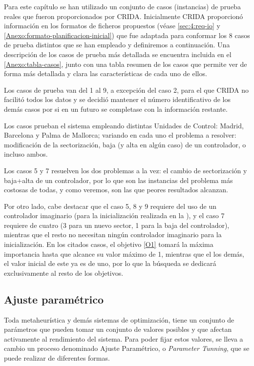 Para este capítulo se han utilizado un conjunto de casos (instancias) de prueba reales que fueron proporcionados por CRIDA. Inicialmente CRIDA proporcionó información en los formatos de ficheros propuestos (véase \autoref{sec:4:req-io} y \autoref{Anexo:formato-planificacion-inicial}) que fue adaptada para conformar los 8 casos de prueba distintos que se han empleado y definiremos a continuación. Una descripción de los casos de prueba más detallada se encuentra incluida en el \autoref{Anexo:tabla-casos}, junto con una tabla resumen de los casos que permite ver de forma más detallada y clara las características de cada uno de ellos.

Los casos de prueba van del 1 al 9, a excepción del caso 2, para el que \gls{CRIDA} no facilitó todos los datos y se decidió mantener el número identificativo de los demás casos por si en un futuro se completase con la información restante.

Los casos prueban el sistema empleando distintas Unidades de Control: Madrid, Barcelona y Palma de Mallorca; variando en cada uno el problema a resolver: modificación de la sectorización, baja (y alta en algún caso) de un controlador, o incluso ambos.

Los casos 5 y 7 resuelven los dos problemas a la vez: el cambio de sectorización y baja+alta de un controlador, por lo que son las instancias del problema más costosas de todas, y como veremos, son las que peores resultados alcanzan. %

Por otro lado, cabe destacar que el caso 5, 8 y 9 requiere del uso de un controlador imaginario (para la inicialización realizada en la \faseuno{}), y el caso 7 requiere de cuatro (3 para un nuevo sector, 1 para la baja del controlador), mientras que el resto no necesitan ningún controlador imaginario para la inicialización. En los citados casos, el objetivo \ref{O1} tomará la máxima importancia hasta que alcance su valor máximo de 1, mientras que el los demás, el valor inicial de este ya es de uno, por lo que la búsqueda se dedicará exclusivamente al resto de los objetivos.

\subsection{Ajuste paramétrico}
Toda metaheurística y demás sistemas de optimización, tiene un conjunto de parámetros que pueden tomar un conjunto de valores posibles y que afectan activamente al rendimiento del sistema. Para poder fijar estos valores, se lleva a cambio un proceso denominado Ajuste Paramétrico, o \textit{Parameter Tunning}, que se puede realizar de diferentes formas.

